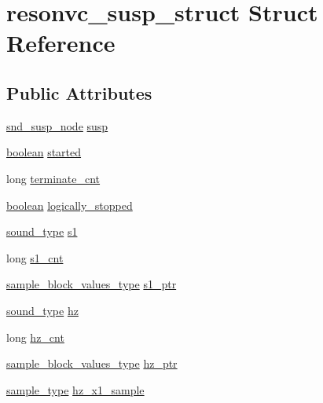 \hypertarget{structresonvc__susp__struct}{}\section{resonvc\+\_\+susp\+\_\+struct Struct Reference}
\label{structresonvc__susp__struct}
\subsection*{Public Attributes}
\begin{DoxyCompactItemize}
\item 
\hyperlink{sound_8h_a6b268203688a934bd798ceb55f85d4c0}{snd\+\_\+susp\+\_\+node} \hyperlink{structresonvc__susp__struct_ada848e1604080fcbdef4e812957bb92d}{susp}
\item 
\hyperlink{cext_8h_a7670a4e8a07d9ebb00411948b0bbf86d}{boolean} \hyperlink{structresonvc__susp__struct_adac8846ea43828257e908ab1e65ce53b}{started}
\item 
long \hyperlink{structresonvc__susp__struct_aea1597de4ab03a41102fe3b52d544050}{terminate\+\_\+cnt}
\item 
\hyperlink{cext_8h_a7670a4e8a07d9ebb00411948b0bbf86d}{boolean} \hyperlink{structresonvc__susp__struct_a55c7ee1a3465e9c51f8e59506a861e9d}{logically\+\_\+stopped}
\item 
\hyperlink{sound_8h_a792cec4ed9d6d636d342d9365ba265ea}{sound\+\_\+type} \hyperlink{structresonvc__susp__struct_a07d41f1406bdcec95f4104f77112271f}{s1}
\item 
long \hyperlink{structresonvc__susp__struct_ab55cd970829e5cfd119fe4ec702fb9c6}{s1\+\_\+cnt}
\item 
\hyperlink{sound_8h_a83d17f7b465d1591f27cd28fc5eb8a03}{sample\+\_\+block\+\_\+values\+\_\+type} \hyperlink{structresonvc__susp__struct_ab9e63e8f194c076c4600dff5b0ff3574}{s1\+\_\+ptr}
\item 
\hyperlink{sound_8h_a792cec4ed9d6d636d342d9365ba265ea}{sound\+\_\+type} \hyperlink{structresonvc__susp__struct_a4cefb3eeee81e5337c9255c9eabaa937}{hz}
\item 
long \hyperlink{structresonvc__susp__struct_ad650a7d92ab80fc1bb444d30411cefb1}{hz\+\_\+cnt}
\item 
\hyperlink{sound_8h_a83d17f7b465d1591f27cd28fc5eb8a03}{sample\+\_\+block\+\_\+values\+\_\+type} \hyperlink{structresonvc__susp__struct_ab927cc51ed7bebbd064d8240e34f00fd}{hz\+\_\+ptr}
\item 
\hyperlink{sound_8h_a3a9d1d4a1c153390d2401a6e9f71b32c}{sample\+\_\+type} \hyperlink{structresonvc__susp__struct_abd3403d924f3f9c088fd6adb6b980f6d}{hz\+\_\+x1\+\_\+sample}

\end{DoxyCompactItemize}
